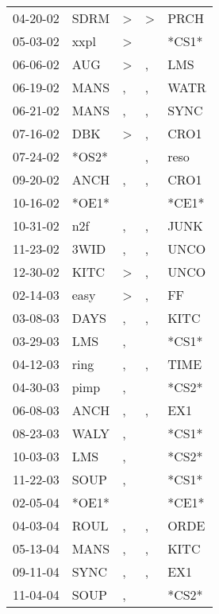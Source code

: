 \begin{supertabular}{lllll}
 04-20-02 &   SDRM &  \textgreater &  \textgreater &   PRCH \\
 05-03-02 &   xxpl &  \textgreater &               &  *CS1* \\
 06-06-02 &    AUG &  \textgreater &             , &    LMS \\
 06-19-02 &   MANS &             , &             , &   WATR \\
 06-21-02 &   MANS &             , &             , &   SYNC \\
 07-16-02 &    DBK &  \textgreater &             , &   CRO1 \\
 07-24-02 &  *OS2* &               &             , &   reso \\
 09-20-02 &   ANCH &             , &             , &   CRO1 \\
 10-16-02 &  *OE1* &               &               &  *CE1* \\
 10-31-02 &    n2f &             , &             , &   JUNK \\
 11-23-02 &   3WID &             , &             , &   UNCO \\
 12-30-02 &   KITC &  \textgreater &             , &   UNCO \\
 02-14-03 &   easy &  \textgreater &             , &     FF \\
 03-08-03 &   DAYS &             , &             , &   KITC \\
 03-29-03 &    LMS &             , &               &  *CS1* \\
 04-12-03 &   ring &             , &             , &   TIME \\
 04-30-03 &   pimp &             , &               &  *CS2* \\
 06-08-03 &   ANCH &             , &             , &    EX1 \\
 08-23-03 &   WALY &             , &               &  *CS1* \\
 10-03-03 &    LMS &             , &               &  *CS2* \\
 11-22-03 &   SOUP &             , &               &  *CS1* \\
 02-05-04 &  *OE1* &               &               &  *CE1* \\
 04-03-04 &   ROUL &             , &             , &   ORDE \\
 05-13-04 &   MANS &             , &             , &   KITC \\
 09-11-04 &   SYNC &             , &             , &    EX1 \\
 11-04-04 &   SOUP &             , &               &  *CS2* \\

\end{supertabular}
